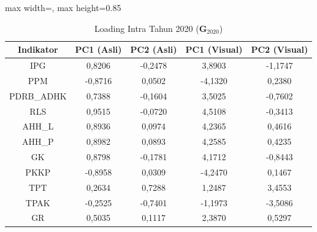 \begin{table}[H]
\centering
\caption{Loading Intra Tahun 2020 ($\mathbf{G}_{2020}$)} \label{tab:app1loading_intra_2020}
\begin{adjustbox}{max width=\textwidth, max height=0.85\textheight}
\begin{tabular}{|c|c|c|c|c|}
\hline
\textbf{Indikator} & \textbf{PC1 (Asli)} & \textbf{PC2 (Asli)} & \textbf{PC1 (Visual)} & \textbf{PC2 (Visual)} \\
\hline
IPG & 0,8206 & -0,2478 & 3,8903 & -1,1747 \\
PPM & -0,8716 & 0,0502 & -4,1320 & 0,2380 \\
PDRB\_ADHK & 0,7388 & -0,1604 & 3,5025 & -0,7602 \\
RLS & 0,9515 & -0,0720 & 4,5108 & -0,3413 \\
AHH\_L & 0,8936 & 0,0974 & 4,2365 & 0,4616 \\
AHH\_P & 0,8982 & 0,0893 & 4,2585 & 0,4235 \\
GK & 0,8798 & -0,1781 & 4,1712 & -0,8443 \\
PKKP & -0,8958 & 0,0309 & -4,2470 & 0,1467 \\
TPT & 0,2634 & 0,7288 & 1,2487 & 3,4553 \\
TPAK & -0,2525 & -0,7401 & -1,1973 & -3,5086 \\
GR & 0,5035 & 0,1117 & 2,3870 & 0,5297 \\
\hline
\end{tabular}
\end{adjustbox}
\end{table}